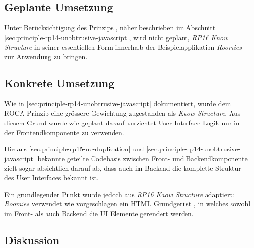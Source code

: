 \subsection*{Geplante Umsetzung}

Unter Berücksichtigung des Prinzips \emph{}, näher beschrieben im Abschnitt \ref{sec:principle-rp14-unobtrusive-javascript}, wird nicht geplant, \emph{RP16 Know Structure} in seiner essentiellen Form innerhalb der Beispielapplikation \emph{Roomies} zur Anwendung zu bringen.


\subsection*{Konkrete Umsetzung}

Wie in \ref{sec:principle-rp14-unobtrusive-javascript} dokumentiert, wurde dem ROCA Prinzip \emph{} eine grössere Gewichtung zugestanden als \emph{Know Structure}. Aus diesem Grund wurde wie geplant darauf verzichtet User Interface Logik nur in der Frontendkomponente zu verwenden.

Die aus \ref{sec:principle-rp15-no-duplication} und \ref{sec:principle-rp14-unobtrusive-javascript} bekannte geteilte Codebasis zwischen Front- und Backendkomponente zielt sogar absichtlich darauf ab, dass auch im Backend die komplette Struktur des User Interfaces bekannt ist.

Ein grundlegender Punkt wurde jedoch aus \emph{RP16 Know Structure} adaptiert: \emph{Roomies} verwendet wie vorgeschlagen ein HTML Grundgerüst \cite{roomiesHtmlSkeleton}, in welches sowohl im Front- als auch Backend die UI Elemente gerendert werden.


\subsection*{Diskussion}






